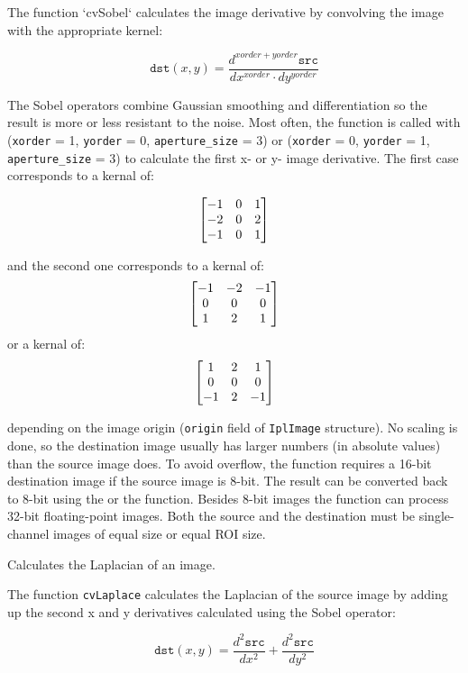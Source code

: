 The function `cvSobel` calculates the image derivative by convolving the image with the appropriate kernel:

\[
\texttt{dst}(x,y) = \frac{d^{xorder+yorder} \texttt{src}}{dx^{xorder} \cdot dy^{yorder}}
\]

The Sobel operators combine Gaussian smoothing and differentiation
so the result is more or less resistant to the noise. Most often,
the function is called with (\texttt{xorder} = 1, \texttt{yorder} = 0,
\texttt{aperture\_size} = 3) or (\texttt{xorder} = 0, \texttt{yorder} = 1,
\texttt{aperture\_size} = 3) to calculate the first x- or y- image
derivative. The first case corresponds to a kernal of:

\[ \begin{bmatrix} -1 & 0 & 1\\ -2 & 0 & 2\\ -1 & 0 & 1 \end{bmatrix}
\]

and the second one corresponds to a kernal of:
\[ \begin{bmatrix} -1 & -2 & -1\\ 0 & 0 & 0\\ 1 & 2 & 1 \end{bmatrix}
\]
or a kernal of:
\[ \begin{bmatrix} 1 & 2 & 1\\ 0 & 0 & 0\\ -1 & 2 & -1 \end{bmatrix}
\]

depending on the image origin (\texttt{origin} field of
\texttt{IplImage} structure). No scaling is done, so the destination image
usually has larger numbers (in absolute values) than the source image does. To
avoid overflow, the function requires a 16-bit destination image if the
source image is 8-bit. The result can be converted back to 8-bit using the
 or the  function. Besides 8-bit images
the function can process 32-bit floating-point images. Both the source and the 
destination must be single-channel images of equal size or equal ROI size.

\label{Laplace}
\label{Laplace}
Calculates the Laplacian of an image.

\begin{description}
\end{description}

The function \texttt{cvLaplace} calculates the Laplacian of the source image by adding up the second x and y derivatives calculated using the Sobel operator:

\[
\texttt{dst}(x,y) = \frac{d^2 \texttt{src}}{dx^2} + \frac{d^2 \texttt{src}}{dy^2}
\]

